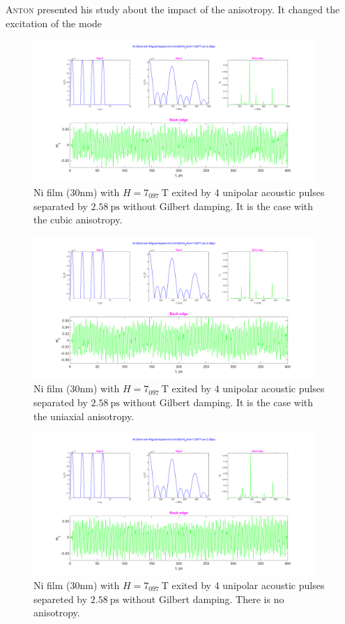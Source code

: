 \documentclass[12pt,a4paper]{article}
\newcommand{\anton}{\textsc{Anton} }
\begin{document}
\anton presented his study about the impact of the anisotropy.
It changed the excitation of the mode
\begin{figure}
    \centering
    \includegraphics[width=0.95\textwidth]{cubic.png}
    \caption{Ni film (30nm) with $H = 7_097\ \mathrm{T}$ exited by 4 unipolar acoustic pulses separated by $2. 58\ \mathrm{ps}$ without Gilbert damping. It is the case with the cubic anisotropy.}
    \label{fig:cubic}
\end{figure}
\begin{figure}
    \centering
    \includegraphics[width=0.95\textwidth]{uniaxial.png}
    \caption{Ni film (30nm) with $H = 7_097\ \mathrm{T}$ exited by 4 unipolar acoustic pulses separated by $2. 58\ \mathrm{ps}$ without Gilbert damping. It is the case with the uniaxial anisotropy.}
    \label{fig:uniaxial}
\end{figure}
\begin{figure}
    \centering
    \includegraphics[width=0.95\textwidth]{none.png}
    \caption{Ni film (30nm) with $H = 7_097\ \mathrm{T}$ exited by 4 unipolar acoustic pulses separeted by $2. 58\ \mathrm{ps}$ without Gilbert damping. There is no anisotropy.}
    \label{fig:none}
\end{figure}
\end{document}
